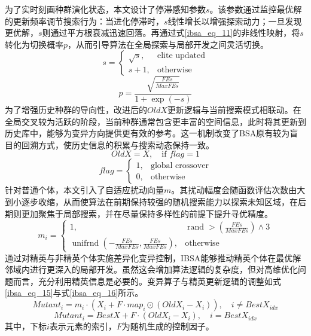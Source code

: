 为了实时刻画种群演化状态，本文设计了停滞感知参数$s$。该参数通过监控最优解的更新频率调节搜索行为：当进化停滞时，$s$线性增长以增强探索动力；一旦发现更优解，$s$则通过平方根衰减迅速回落。再通过式\eqref{ibsa_eq_11}的非线性映射，将$s$转化为切换概率$p$，从而引导算法在全局探索与局部开发之间灵活切换。
\begin{equation}
\label{ibsa_eq_10}
s=
\begin{cases}
\sqrt{s}, & \text{elite updated}\\
s+1, & \text{otherwise}
\end{cases}
\end{equation}
\begin{equation}
\label{ibsa_eq_11}
p=\frac{\sqrt{\frac{FEs}{MaxFEs}}}{1+\exp\left(-s\right)}
\end{equation}
为了增强历史种群的导向性，改进后的$OldX$更新逻辑与当前搜索模式相联动。在全局交叉较为活跃的阶段，当前种群通常包含更丰富的空间信息，此时将其更新到历史库中，能够为变异方向提供更有效的参考。这一机制改变了BSA原有较为盲目的回溯方式，使历史信息的积累与搜索动态保持一致。
\begin{equation}
\label{ibsa_eq_12}
OldX = X,\quad \text{if } flag = 1
\end{equation}
\begin{equation}
\label{ibsa_eq_13}
flag=
\begin{cases}
1, & \text{global crossover}\\
0, & \text{otherwise}
\end{cases}
\end{equation}
针对普通个体，本文引入了自适应扰动向量$m$。其扰动幅度会随函数评估次数由大到小逐步收缩，从而使算法在前期保持较强的随机搜索能力以探索未知区域，在后期则更加聚焦于局部搜索，并在尽量保持多样性的前提下提升寻优精度。
\begin{equation}
\label{ibsa_eq_14}
m_i=
\begin{cases}
1, & \operatorname{rand}>\left(\frac{FEs}{MaxFEs}\right)\wedge 3\\
\operatorname{unifrnd}\left(-\frac{FEs}{MaxFEs},\frac{FEs}{MaxFEs}\right), & \text{otherwise}
\end{cases}
\end{equation}
通过对精英与非精英个体实施差异化变异控制，IBSA能够推动精英个体在最优解邻域内进行更深入的局部开发。虽然这会增加算法逻辑的复杂度，但对高维优化问题而言，充分利用精英信息是必要的。变异算子与精英更新逻辑的调整如式\eqref{ibsa_eq_15}与式\eqref{ibsa_eq_16}所示。
\begin{equation}
\label{ibsa_eq_15}
Mutant_i = m_i \cdot \left(X_i + F \cdot map_i \odot \left(OldX_i - X_i\right)\right), \quad i \neq BestX_{idx}
\end{equation}
\begin{equation}
\label{ibsa_eq_16}
Mutant_i = BestX + F \cdot \left(OldX_i - X_i\right), \quad i = BestX_{idx}
\end{equation}
\noindent 其中，下标$i$表示元素的索引，$F$为随机生成的控制因子。

